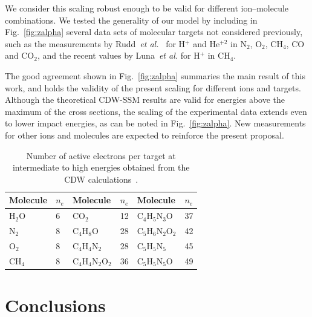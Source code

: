 \documentclass[10pt,showpacs,showkeys,twocolumn]{revtex4-1}
\begin{document}
We consider this scaling robust enough to be valid for different 
ion--molecule combinations. We tested the generality of our model 
by including in Fig.~\ref{fig:zalpha} several data sets of 
molecular targets not considered previously, such as the measurements 
by Rudd~\textit{et al.}~\cite{Rudd85,Rudd1983} for H$^{+}$ and He$^{+2}$ 
in N$_2$, O$_2$, CH$_4$, CO and CO$_2$, and the recent values by 
Luna~\textit{et al.} \cite{Luna2019} for H$^{+}$ in CH$_4$. 

The good agreement shown in Fig.~\ref{fig:zalpha} summaries the main 
result of this work, and holds the validity of the present scaling for different ions and targets.
Although the theoretical CDW-SSM results are valid for energies above 
the maximum of the cross sections, %
the scaling of the experimental data extends 
even to lower impact energies, as can be noted in Fig.~\ref{fig:zalpha}. 
New measurements for other ions and molecules are expected to 
reinforce the present proposal. 

\begin{table}[t]
\begin{center}
\begin{tabular}{|ll|ll|ll|}
\hline
 Molecule & $n_e$ & Molecule          & $n_e$ & Molecule          & $n_e$ \\
\hline
 H$_2$O   & 6  & CO$_2$               & 12 & C$_4$H$_5$N$_3$O     & 37   \\ 
 N$_2$    & 8  & C$_4$H$_8$O          & 28 & C$_5$H$_6$N$_2$O$_2$ & 42   \\ 
 O$_2$    & 8  & C$_4$H$_4$N$_2$      & 28 & C$_5$H$_5$N$_5$      & 45   \\ 
 CH$_4$   & 8  & C$_4$H$_4$N$_2$O$_2$ & 36 & C$_5$H$_5$N$_5$O     & 49   \\ 
 \hline
\end{tabular}
\caption{Number of active electrons per target at intermediate to high 
energies obtained from the CDW calculations~\cite{MendezJPB20}.}
\label{nn}
\end{center}
\vspace{-0.75cm}
\end{table}

\section{Conclusions}
\end{document}
